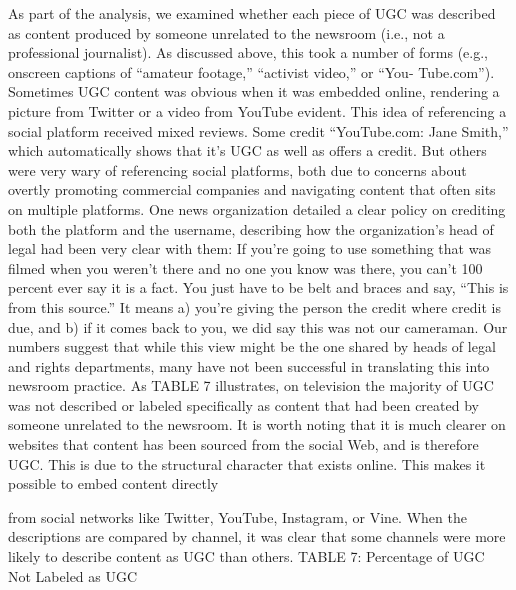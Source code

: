 \documentclass[symmetric, notoc, nobib]{towcenter-book}
\begin{document}
As part of the analysis, we examined whether each piece of UGC was
described as content produced by someone unrelated to the newsroom (i.e.,
not a professional journalist). As discussed above, this took a number of
forms (e.g., onscreen captions of ``amateur footage,'' ``activist video,'' or ``You-
Tube.com''). Sometimes UGC content was obvious when it was embedded
online, rendering a picture from Twitter or a video from YouTube evident.
This idea of referencing a social platform received mixed reviews. Some
credit ``YouTube.com: Jane Smith,'' which automatically shows that it's UGC
as well as offers a credit. But others were very wary of referencing social
platforms, both due to concerns about overtly promoting commercial companies
and navigating content that often sits on multiple platforms.
One news organization detailed a clear policy on crediting both the platform
and the username, describing how the organization's head of legal had
been very clear with them:
If you're going to use something that was filmed when you weren't
there and no one you know was there, you can't 100 percent ever say
it is a fact. You just have to be belt and braces and say, ``This is from
this source.'' It means a) you're giving the person the credit where
credit is due, and b) if it comes back to you, we did say this was not
our cameraman.
Our numbers suggest that while this view might be the one shared by heads
of legal and rights departments, many have not been successful in translating
this into newsroom practice. As TABLE 7 illustrates, on television the
majority of UGC was not described or labeled specifically as content that
had been created by someone unrelated to the newsroom. It is worth noting
that it is much clearer on websites that content has been sourced from
the social Web, and is therefore UGC. This is due to the structural character
that exists online. This makes it possible to embed content directly

from social networks like Twitter, YouTube, Instagram, or Vine. When the
descriptions are compared by channel, it was clear that some channels were
more likely to describe content as UGC than others.
TABLE 7: Percentage of UGC Not Labeled as UGC
\end{document}
